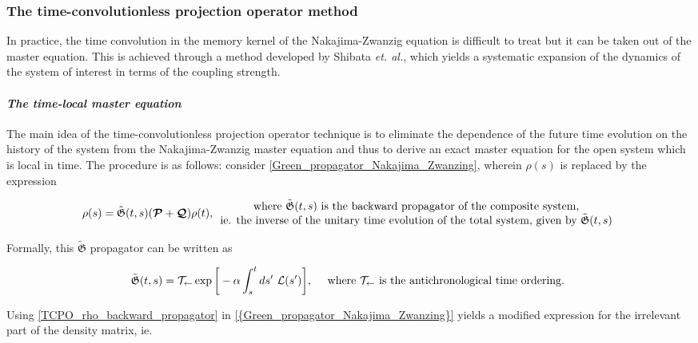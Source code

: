 \documentclass{homework}
\begin{document}
\subsubsection{\textbf{The time-convolutionless projection operator method}}

In practice, the time convolution in the memory kernel of the Nakajima-Zwanzig equation is difficult to treat but it can be taken out of the master equation. This is achieved through a  method developed by Shibata \textit{et. al.}, which yields a systematic expansion of the dynamics of the system of interest in terms of the coupling strength. \\

\paragraph{\textit{The time-local master equation}}

The main idea of the time-convolutionless projection operator technique is to eliminate the dependence of the future time evolution on the history of the system from the Nakajima-Zwanzig master equation and thus to derive an exact master equation for the open system which is local in time. The procedure is as follows: consider  \cref{Green_propagator_Nakajima_Zwanzing}, wherein $\rho(s)$ is replaced by the expression

\begin{equation}
    \rho(s) = \tilde{\mathfrak{G}}(t,s) (\bm{\mathcal{P}} + \bm{\mathcal{Q}}) \rho(t), \begin{array}{cc}
         \textnormal{ where $\tilde{\mathfrak{G}}(t,s)$ is the backward propagator of the composite system,  } \\
         \textnormal{ie. the inverse of the unitary time evolution of the total system, given by } \tilde{\mathfrak{G}}(t,s)
    \end{array}
    \label{TCPO_rho_backward_propagator}
\end{equation}

Formally, this $\tilde{\mathfrak{G}}$ propagator can be written as 

\begin{equation}
    \tilde{\mathfrak{G}}(t,s) = \mathcal{T}_{\leftarrow} \exp \bigg[- \alpha \int_{s}^t ds' \textnormal{ } \mathcal{L}(s')\bigg], \quad \textnormal{ where $\mathcal{T}_{\leftarrow}$ is the antichronological time ordering. }
\end{equation}

Using \cref{TCPO_rho_backward_propagator} in \cref{{Green_propagator_Nakajima_Zwanzing}} yields a modified expression for the irrelevant part of the density matrix, ie. 
\end{document}
